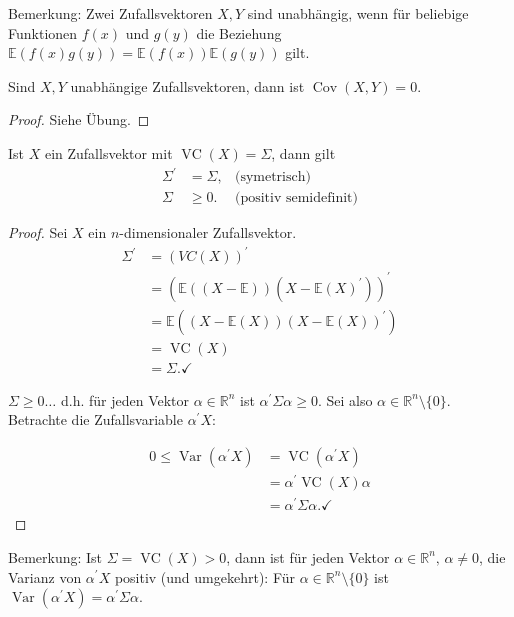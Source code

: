 \documentclass{tstextbook}
\DeclareMathOperator{\Cov}{Cov}
\DeclareMathOperator{\VC}{VC} %
\DeclareMathOperator{\Var}{Var}
\newcommand{\R}{\mathbb R}
\begin{document}
\begin{remark}
	Bemerkung: Zwei Zufallsvektoren $ X,Y $ sind unabhängig, wenn für beliebige Funktionen $ f(x) $ und $ g(y) $ die Beziehung $ \mathbb{E}(f(x)g(y))=\mathbb{E}(f(x))\mathbb{E}(g(y)) $ gilt.
\end{remark}

\begin{theorem}
	Sind $ X,Y $ unabhängige Zufallsvektoren, dann ist $ \Cov(X,Y)=0. $
\end{theorem}

\begin{proof}
	Siehe Übung.
\end{proof}

\begin{theorem}
	
	Ist $ X $ ein Zufallsvektor mit $ \VC(X)=\Sigma $, dann gilt 
	\[\begin{aligned}
	\Sigma^\prime &=\Sigma, & \text{(symetrisch)} \\
	\Sigma & \ge0. & \text{(positiv semidefinit)}
	\end{aligned}
	\] 
	
\end{theorem}

\begin{proof}
	Sei $ X $ ein $n$-dimensionaler Zufallsvektor. 
	\begin{align*}
	\Sigma^\prime &=(VC(X))^\prime \\
	& = (\mathbb{E}((X-\mathbb{E}))(X-\mathbb{E}(X)^\prime))^\prime \\
	& = \mathbb{E}((X-\mathbb{E}(X))(X-\mathbb{E}(X))^\prime)\\
	& = \VC(X)\\
	& = \Sigma.\checkmark
\end{align*}

$ \Sigma\ge0\ldots $ d.h. für jeden Vektor $ \alpha\in\mathbb{R}^n $ ist $ \alpha^\prime\Sigma\alpha\ge0. $
Sei also $ \alpha\in\mathbb{R}^n\setminus\{0\}. $ Betrachte die Zufallsvariable $ \alpha^\prime X: $

\begin{align*}	
	0 \le \Var(\alpha^\prime X) & = \VC(\alpha^\prime X) \\
	&= \alpha^\prime \VC(X)\alpha\\
	&= \alpha^\prime\Sigma\alpha.\checkmark	
\end{align*}	

\end{proof}

\begin{remark}
	Bemerkung: Ist $ \Sigma = \VC(X) > 0 $, dann ist für jeden Vektor $ \alpha \in \R^n, \, \alpha \ne 0 $, die Varianz von $ \alpha^\prime X $ positiv (und umgekehrt): 
	Für $ \alpha \in \R^n\setminus\{0\} $ ist $ \Var(\alpha^\prime X) = \alpha^\prime \Sigma \alpha $.
\end{remark}
\end{document}
